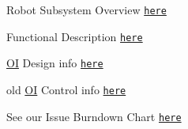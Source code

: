 Robot Subsystem Overview \href{https://github.com/Skunkworks1983/2015RecycleRush/wiki/B.-Subsystem-Overview}{\tt here}

Functional Description \href{https://github.com/Skunkworks1983/2015RecycleRush/wiki/X.-Functional-Description}{\tt here}

\hyperlink{class_o_i}{O\+I} Design info \href{https://docs.google.com/document/d/1307EkZ70Ms_A18SRqZMjkO8lUgM1VjDmNFRu5OP-lws/edit}{\tt here}

old \hyperlink{class_o_i}{O\+I} Control info \href{https://github.com/Skunkworks1983/2015RecycleRush/wiki/Y.-OI Controls}{\tt here}

See our Issue Burndown Chart \href{https://docs.google.com/spreadsheets/d/10eZPQDmWJB_CP9vZHVbTWkLEizyK4L0aCjfdwTTO4bE/edit#gid=0}{\tt here} 
